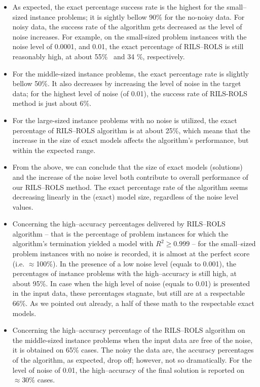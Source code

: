 \documentclass[a4paper,12pt]{elsarticle}
\begin{document}
\begin{itemize}
	\item   As expected, the exact percentage success rate is the highest for the small--sized instance problems; it is sightly bellow 90\% for the no-noisy data. For noisy data, the success rate of the algorithm gets decreased as the level of noise increases. For example, on the small-sized problem instances with the noise level  of 0.0001, and 0.01, the exact percentage of \textsc{RILS}--\textsc{ROLS} is still reasonably high, at about 55\%~ and 34 \%, respectively. 
	\item For the middle-sized instance problems, the exact percentage rate is slightly bellow 50\%. It also decreases by increasing the level of noise in the target data; for the highest level of noise (of 0.01), the success rate of \textsc{RILS}-\textsc{ROLS} method is just about 6\%. 
	\item For the large-sized instance problems with no noise is utilized, the exact percentage of \textsc{RILS}--\textsc{ROLS} algorithm is at about 25\%, which means that the increase in the size of exact models affects the algorithm's performance, but within the expected range.  
	
	\item From the above, we can conclude that the size of exact models (solutions) and the increase of the noise level both contribute to overall performance of our \textsc{RILS}--\textsc{ROLS} method. The exact percentage rate of the algorithm seems decreasing linearly  in the (exact) model size, regardless of the noise level values.
	
	\item Concerning the high--accuracy percentages delivered by \textsc{RILS}--\textsc{ROLS} algorithm -- that is the percentage of problem instances for which the algorithm's termination yielded a model with $R^2 \geq 0.999$ -- for the small--sized problem instances with no noise is recorded, it is almost at the perfect score (i.e. $\approx$100\%). In the presence of a low noise level (equals to 0.001), the percentages of instance problems with the high--accuracy is still high, at about 95\%. In case when the high level of noise (equals to 0.01) is presented in the input data, these percentages stagnate, but still are at a respectable 66\%. %
	As we pointed out already, a half of these math to the respectable exact models.
	
	\item Concerning the high--accuracy percentage of the \textsc{RILS}--\textsc{ROLS} algorithm on the middle-sized instance problems when the input data are free of the noise, it is obtained on 65\% cases.    The noisy the data are, the accuracy percentages of the algorithm, as expected, drop off; however, not so dramatically. For the level of noise of 0.01, the high--accuracy of the final solution is reported on $\approx$30\% cases.
	

\end{itemize}
\end{document}
